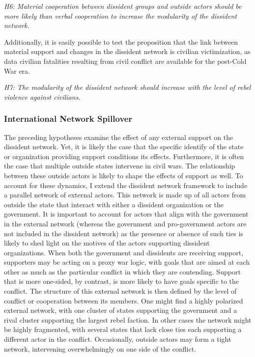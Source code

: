 \noindent \textit{H6: Material cooperation between dissident groups and outside actors should be more likely than verbal cooperation to increase the modularity of the dissident network.}

Additionally, it is easily possible to test the proposition that the link between material support and changes in the dissident network is civilian victimization, as data civilian fatalities resulting from civil conflict are available for the post-Cold War era.

\noindent \textit{H7: The modularity of the dissident network should increase with the level of rebel violence against civilians.}

\subsubsection{International Network Spillover}

The preceding hypotheses examine the effect of any external support on the dissident network. Yet, it is likely the case that the specific identify of the state or organization providing support conditions its effects. Furthermore, it is often the case that multiple outside states intervene in civil wars. The relationship between these outside actors is likely to shape the effects of support as well. To account for these dynamics, I extend the dissident network framework to include a parallel network of external actors. This network is made up of all actors from outside the state that interact with either a dissident organization or the government. It is important to account for actors that align with the government in the external network (whereas the government and pro-government actors are not included in the dissident network) as the presence or absence of such ties is likely to shed light on the motives of the actors supporting dissident organizations. When both the government and dissidents are receiving support, supporters may be acting on a proxy war logic, with goals that are aimed at each other as much as the particular conflict in which they are contending. Support that is more one-sided, by contrast, is more likely to have goals specific to the conflict. The structure of this external network is then defined by the level of conflict or cooperation between its members. One might find a highly polarized external network, with one cluster of states supporting the government and a rival cluster supporting the largest rebel faction. In other cases the network might be highly fragmented, with several states that lack close ties each supporting a different actor in the conflict. Occasionally, outside actors may form a tight network, intervening overwhelmingly on one side of the conflict.

